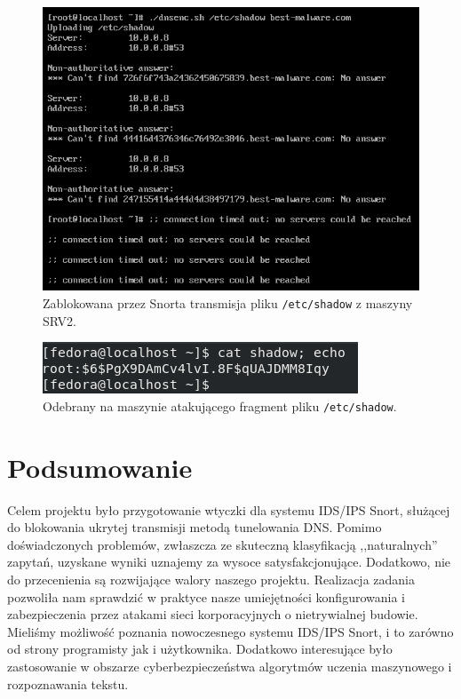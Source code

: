 \documentclass{eiti-raport}
\begin{document}
\begin{figure}[!h] \centering
	\includegraphics[width=0.95\linewidth]{img/dnsenc.PNG}
	\caption{Zablokowana przez Snorta transmisja pliku \texttt{/etc/shadow} z maszyny SRV2.} \label{fig:dnsenc}
\end{figure}

\begin{figure}[!h] \centering
	\includegraphics[width=0.65\linewidth]{img/dnsdec.PNG}
	\caption{Odebrany na maszynie atakującego fragment pliku \texttt{/etc/shadow}.} \label{fig:dnsdec}
\end{figure}

\section{Podsumowanie} \label{sec:summary}
Celem projektu było przygotowanie wtyczki dla systemu IDS/IPS Snort, służącej do blokowania ukrytej transmisji metodą tunelowania DNS. Pomimo doświadczonych problemów, zwłaszcza ze skuteczną klasyfikacją ,,naturalnych'' zapytań, uzyskane wyniki uznajemy za wysoce satysfakcjonujące. Dodatkowo, nie do przecenienia są rozwijające walory naszego projektu. Realizacja zadania pozwoliła nam sprawdzić w praktyce nasze umiejętności konfigurowania i zabezpieczenia przez atakami sieci korporacyjnych o nietrywialnej budowie. Mieliśmy możliwość poznania nowoczesnego systemu IDS/IPS Snort, i to zarówno od strony programisty jak i użytkownika. Dodatkowo interesujące było zastosowanie w obszarze cyberbezpieczeństwa algorytmów uczenia maszynowego i rozpoznawania tekstu. 

\printbibliography
\end{document}
